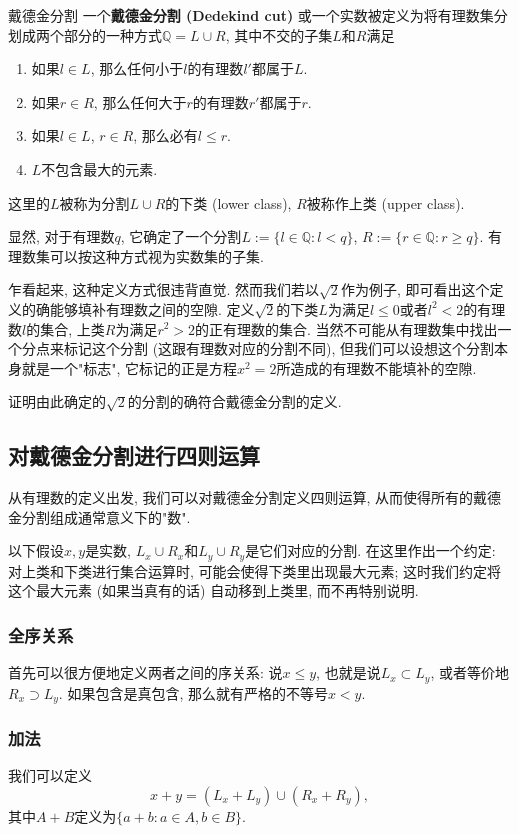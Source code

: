 \begin{definition}{戴德金分割}
一个\textbf{戴德金分割 (Dedekind cut)} 或一个实数被定义为将有理数集分划成两个部分的一种方式$\mathbb{Q}=L\cup R$, 其中不交的子集$L$和$R$满足

\begin{enumerate}
\item 如果$l\in L$, 那么任何小于$l$的有理数$l'$都属于$L$.
\item 如果$r\in R$, 那么任何大于$r$的有理数$r'$都属于$r$.
\item 如果$l\in L$, $r\in R$, 那么必有$l\leq r$.
\item $L$不包含最大的元素.
\end{enumerate}

这里的$L$被称为分割$L\cup R$的下类 (lower class), $R$被称作上类 (upper class).
\end{definition}

显然, 对于有理数$q$, 它确定了一个分割$L:=\{l\in\mathbb{Q}:l<q\}$, $R:=\{r\in\mathbb{Q}:r\geq q\}$. 有理数集可以按这种方式视为实数集的子集.

乍看起来, 这种定义方式很违背直觉. 然而我们若以$\sqrt{2}$作为例子, 即可看出这个定义的确能够填补有理数之间的空隙. 定义$\sqrt{2}$的下类$L$为满足$l\leq0$或者$l^2<2$的有理数$l$的集合, 上类$R$为满足$r^2>2$的正有理数的集合. 当然不可能从有理数集中找出一个分点来标记这个分割 (这跟有理数对应的分割不同), 但我们可以设想这个分割本身就是一个"标志", 它标记的正是方程$x^2=2$所造成的有理数不能填补的空隙.
\begin{exercise}{}
证明由此确定的$\sqrt{2}$的分割的确符合戴德金分割的定义.
\end{exercise}

\subsection{对戴德金分割进行四则运算}
从有理数的定义出发, 我们可以对戴德金分割定义四则运算, 从而使得所有的戴德金分割组成通常意义下的"数". 

以下假设$x,y$是实数, $L_x\cup R_x$和$L_y\cup R_y$是它们对应的分割. 在这里作出一个约定: 对上类和下类进行集合运算时, 可能会使得下类里出现最大元素; 这时我们约定将这个最大元素 (如果当真有的话) 自动移到上类里, 而不再特别说明.

\subsubsection{全序关系}

首先可以很方便地定义两者之间的序关系: 说$x\leq y$, 也就是说$L_x\subset L_y$, 或者等价地$R_x\supset L_y$. 如果包含是真包含, 那么就有严格的不等号$x<y$. 

\subsubsection{加法}

我们可以定义
$$
x+y=(L_x+L_y)\cup(R_x+R_y),
$$
其中$A+B$定义为$\{a+b:a\in A, b\in B\}$. 
